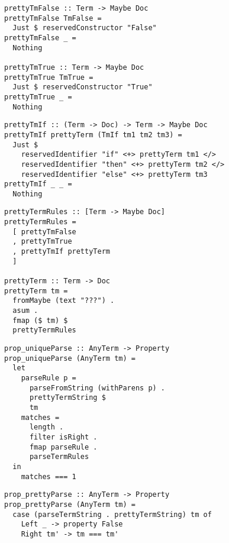 \documentclass{beamer}
\begin{document}
\begin{frame}[fragile]
  \begin{verbatim}
prettyTmFalse :: Term -> Maybe Doc
prettyTmFalse TmFalse =
  Just $ reservedConstructor "False"
prettyTmFalse _ =
  Nothing

prettyTmTrue :: Term -> Maybe Doc
prettyTmTrue TmTrue =
  Just $ reservedConstructor "True"
prettyTmTrue _ =
  Nothing
  \end{verbatim}
\end{frame} 

\begin{frame}[fragile]
  \begin{verbatim}
prettyTmIf :: (Term -> Doc) -> Term -> Maybe Doc
prettyTmIf prettyTerm (TmIf tm1 tm2 tm3) =
  Just $
    reservedIdentifier "if" <+> prettyTerm tm1 </>
    reservedIdentifier "then" <+> prettyTerm tm2 </>
    reservedIdentifier "else" <+> prettyTerm tm3
prettyTmIf _ _ =
  Nothing
  \end{verbatim}
\end{frame} 

\begin{frame}[fragile]
  \begin{verbatim}
prettyTermRules :: [Term -> Maybe Doc]
prettyTermRules =
  [ prettyTmFalse
  , prettyTmTrue
  , prettyTmIf prettyTerm
  ]

prettyTerm :: Term -> Doc
prettyTerm tm =
  fromMaybe (text "???") .
  asum .
  fmap ($ tm) $
  prettyTermRules
  \end{verbatim}
\end{frame} 

\begin{frame}[fragile]
  \begin{verbatim}
prop_uniqueParse :: AnyTerm -> Property
prop_uniqueParse (AnyTerm tm) =
  let
    parseRule p = 
      parseFromString (withParens p) .
      prettyTermString $
      tm
    matches =
      length .
      filter isRight .
      fmap parseRule .
      parseTermRules
  in
    matches === 1
  \end{verbatim}
\end{frame} 

\begin{frame}[fragile]
  \begin{verbatim}
prop_prettyParse :: AnyTerm -> Property
prop_prettyParse (AnyTerm tm) =
  case (parseTermString . prettyTermString) tm of
    Left _ -> property False
    Right tm' -> tm === tm'
  \end{verbatim}
\end{frame} 
\end{document}
